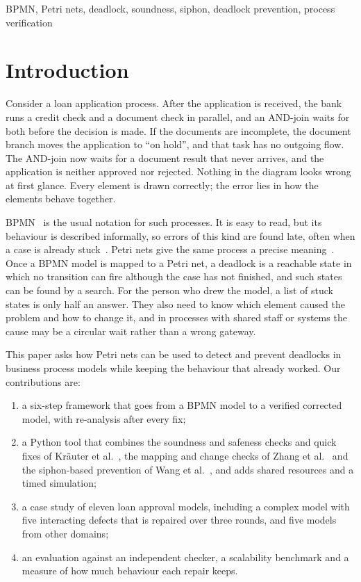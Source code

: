 \documentclass[conference]{IEEEtran}
\begin{document}
\begin{IEEEkeywords}
BPMN, Petri nets, deadlock, soundness, siphon, deadlock prevention, process verification
\end{IEEEkeywords}

\section{Introduction}
Consider a loan application process. After the application is received, the bank runs a credit check and a
document check in parallel, and an AND-join waits for both before the decision is made. If the documents are
incomplete, the document branch moves the application to ``on hold'', and that task has no outgoing flow. The
AND-join now waits for a document result that never arrives, and the application is neither approved nor
rejected. Nothing in the diagram looks wrong at first glance. Every element is drawn correctly; the error lies
in how the elements behave together.

BPMN~\cite{bpmn} is the usual notation for such processes. It is easy to read, but its behaviour is described
informally, so errors of this kind are found late, often when a case is already stuck~\cite{kraeuter,zhang}.
Petri nets give the same process a precise meaning~\cite{murata}. Once a BPMN model is mapped to a Petri net, a
deadlock is a reachable state in which no transition can fire although the case has not finished, and such
states can be found by a search. For the person who drew the model, a list of stuck states is only half an
answer. They also need to know which element caused the problem and how to change it, and in processes with
shared staff or systems the cause may be a circular wait rather than a wrong gateway.

This paper asks how Petri nets can be used to detect and prevent deadlocks in business process models while
keeping the behaviour that already worked. Our contributions are:
\begin{enumerate}
\item a six-step framework that goes from a BPMN model to a verified corrected model, with re-analysis after
every fix;
\item a Python tool that combines the soundness and safeness checks and quick fixes of Kr\"auter
et al.~\cite{kraeuter}, the mapping and change checks of Zhang et al.~\cite{zhang} and the siphon-based
prevention of Wang et al.~\cite{wang}, and adds shared resources and a timed simulation;
\item a case study of eleven loan approval models, including a complex model with five interacting defects
that is repaired over three rounds, and five models from other domains;
\item an evaluation against an independent checker, a scalability benchmark and a measure of how much
behaviour each repair keeps.
\end{enumerate}
\end{document}
